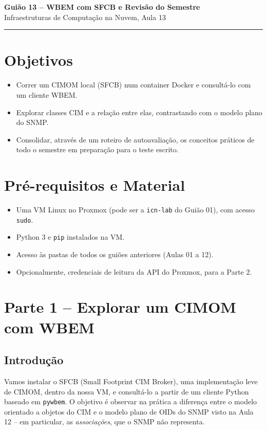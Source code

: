 \documentclass[11pt,a4paper]{article}
\newcommand{\guiaotitle}[2]{%
  \begin{center}
  {\Large\bfseries\color{TextEspresso} #1}\\[0.3cm]
  {\normalsize\color{NudeTaupe} #2}\\[0.2cm]
  {\color{NudeTaupe}\rule{4cm}{0.5pt}}
  \end{center}
  \vspace{0.5cm}
}
\begin{document}
\guiaotitle{Guião 13 -- WBEM com SFCB e Revisão do Semestre}{Infraestruturas de Computação na Nuvem, Aula 13}

\section{Objetivos}
\begin{itemize}[itemsep=0.2cm]
  \item Correr um CIMOM local (SFCB) num container Docker e consultá-lo com um cliente WBEM.
  \item Explorar classes CIM e a relação entre elas, contrastando com o modelo plano do SNMP.
  \item Consolidar, através de um roteiro de autoavaliação, os conceitos práticos de todo o semestre em preparação para o teste escrito.
\end{itemize}

\section{Pré-requisitos e Material}
\begin{itemize}[itemsep=0.2cm]
  \item Uma VM Linux no Proxmox (pode ser a \texttt{icn-lab} do Guião 01), com acesso \texttt{sudo}.
  \item Python 3 e \texttt{pip} instalados na VM.
  \item Acesso às pastas de todos os guiões anteriores (Aulas 01 a 12).
  \item Opcionalmente, credenciais de leitura da API do Proxmox, para a Parte 2.
\end{itemize}

\section{Parte 1 -- Explorar um CIMOM com WBEM}

\subsection{Introdução}
Vamos instalar o SFCB (Small Footprint CIM Broker), uma implementação leve de CIMOM, dentro da nossa VM, e consultá-lo a partir de um cliente Python baseado em \texttt{pywbem}. O objetivo é observar na prática a diferença entre o modelo orientado a objetos do CIM e o modelo plano de OIDs do SNMP visto na Aula 12 -- em particular, as \emph{associações}, que o SNMP não representa.
\end{document}
